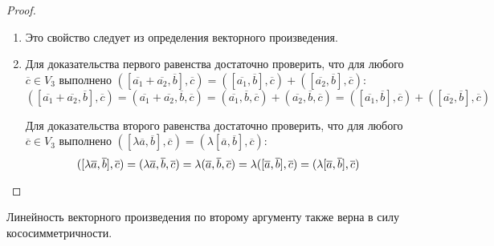     \begin{proof}~
    	\begin{enumerate}
    		\item Это свойство следует из определения векторного произведения.
    		\item Для доказательства первого равенства достаточно проверить, что для любого $\overline{c} \in V_3$ выполнено $([\overline{a_1} + \overline{a_2}, \overline{b}], \overline{c}) = ([\overline{a_1}, \overline{b}], \overline{c}) + ([\overline{a_2}, \overline{b}], \overline{c})$:
    		\[
    		([\overline{a_1} + \overline{a_2}, \overline{b}], \overline{c}) = (\overline{a_1} + \overline{a_2}, \overline{b}, \overline{c}) = (\overline{a_1}, \overline{b}, \overline{c}) + (\overline{a_2}, \overline{b}, \overline{c}) = ([\overline{a_1}, \overline{b}], \overline{c}) + ([\overline{a_2}, \overline{b}], \overline{c})
    		\]
    		
    		Для доказательства второго равенства достаточно проверить, что для любого $\overline{c} \in V_3$ выполнено $([\lambda\overline{a}, \overline{b}], \overline{c}) = (\lambda[\overline{a}, \overline{b}], \overline{c})$:
    		\[
    		([\lambda\overline{a}, \overline{b}], \overline{c}) = (\lambda\overline{a}, \overline{b}, \overline{c}) = \lambda(\overline{a}, \overline{b}, \overline{c}) = \lambda([\overline{a}, \overline{b}], \overline{c}) = (\lambda[\overline{a}, \overline{b}], \overline{c})
    		\qedhere
    		\]
    	\end{enumerate}
    \end{proof}
    
    \begin{note}
    	Линейность векторного произведения по второму аргументу также верна в силу кососимметричности.
    \end{note}
    
